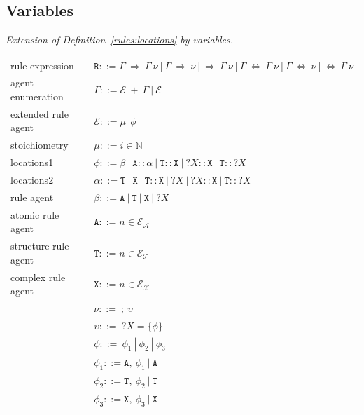 \documentclass[12pt]{fithesis2}
\begin{document}
\subsection{Variables}

\begin{definition}\label{rules:variables}
\emph{Extension of Definition~\ref{rules:locations} by variables.}

\begin{center}
{\small
\hspace*{-1cm}\begin{tabular}{ l l }
rule expression & $\mathtt{R} ::= \Gamma ~\Rightarrow~ \Gamma ~\nu ~|~ \Gamma ~\Rightarrow ~\nu ~|~ \Rightarrow~ \Gamma ~\nu ~|~ \Gamma ~\Leftrightarrow~ \Gamma ~\nu ~|~ \Gamma ~\Leftrightarrow ~\nu ~|~ \Leftrightarrow~ \Gamma ~\nu $\\
 agent enumeration & $\Gamma ::= \mathcal{E}~ +~\Gamma ~|~ \mathcal{E}$\\
 extended rule agent & $\mathcal{E} ::= \mu ~~ \phi$\\
 stoichiometry & $\mu ::= i \in \mathbb{N}$\\
 locations1 & $\phi ::= \beta ~|~ \mathtt{A} :: \alpha ~|~ \mathtt{T}::\mathtt{X} ~|~ ?X::\mathtt{X} ~|~ \mathtt{T}::?X$\\
 locations2 & $\alpha ::= \mathtt{T} ~|~ \mathtt{X} ~|~ \mathtt{T} :: \mathtt{X} ~|~ ?X ~|~ ?X::\mathtt{X} ~|~ \mathtt{T}::?X$\\
 rule agent & $\beta ::= \mathtt{A} ~|~ \mathtt{T} ~|~ \mathtt{X} ~|~ ?X$\\
 atomic rule agent & $\mathtt{A} ::= n \in \mathcal{E}_\mathcal{A}$\\
 structure rule agent & $\mathtt{T} ::= n \in \mathcal{E}_\mathcal{T}$\\
 complex rule agent & $\mathtt{X} ::= n \in \mathcal{E}_\mathcal{X}$\\

& $\nu ::=~ ;~\upsilon$\\
& $\upsilon ::=~?X = \{\phi\}$\\
& $\phi ::=~\phi_1~|~\phi_2~|~\phi_3$\\
& $\phi_1 ::= \mathtt{A},~\phi_1~|~\mathtt{A}$\\
& $\phi_2 ::= \mathtt{T},~\phi_2~|~\mathtt{T}$\\
& $\phi_3 ::= \mathtt{X},~\phi_3~|~\mathtt{X}$\\
\end{tabular}
}
\end{center}

\end{definition}
\end{document}
